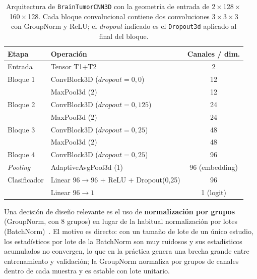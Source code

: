 \begin{table}[ht]
  \centering
  \caption[Arquitectura de \texttt{BrainTumorCNN3D}]{Arquitectura de \texttt{BrainTumorCNN3D} con la geometría de entrada
  de 2\,$\times$\,128\,$\times$\,160\,$\times$\,128. Cada bloque convolucional
  contiene dos convoluciones $3\times3\times3$ con GroupNorm y ReLU; el
  \emph{dropout} indicado es el \texttt{Dropout3d} aplicado al final del bloque.}
  \label{tab:arquitectura}
  \begin{tabular}{l l c}
    \hline
    \textbf{Etapa} & \textbf{Operación} & \textbf{Canales / dim.} \\
    \hline
    Entrada            & Tensor T1+T2                       & 2 \\
    Bloque 1           & ConvBlock3D ($dropout=0{,}0$)      & 12 \\
                       & MaxPool3d (2)                      & 12 \\
    Bloque 2           & ConvBlock3D ($dropout=0{,}125$)    & 24 \\
                       & MaxPool3d (2)                      & 24 \\
    Bloque 3           & ConvBlock3D ($dropout=0{,}25$)     & 48 \\
                       & MaxPool3d (2)                      & 48 \\
    Bloque 4           & ConvBlock3D ($dropout=0{,}25$)     & 96 \\
    \emph{Pooling}     & AdaptiveAvgPool3d (1)              & 96 (embedding) \\
    \hline
    Clasificador       & Linear $96\!\rightarrow\!96$ + ReLU + Dropout(0,25) & 96 \\
                       & Linear $96\!\rightarrow\!1$        & 1 (logit) \\
    \hline
  \end{tabular}
\end{table}

Una decisión de diseño relevante es el uso de \textbf{normalización por grupos}
(GroupNorm, con 8 grupos) en lugar de la habitual normalización por lotes
(BatchNorm)~\cite{wu2018groupnorm}. El motivo es directo: con un tamaño de lote
de un único estudio, los estadísticos por lote de la BatchNorm son muy ruidosos
y sus estadísticos acumulados no convergen, lo que en la práctica genera una
brecha grande entre entrenamiento y validación; la GroupNorm normaliza por
grupos de canales dentro de cada muestra y es estable con lote unitario.

